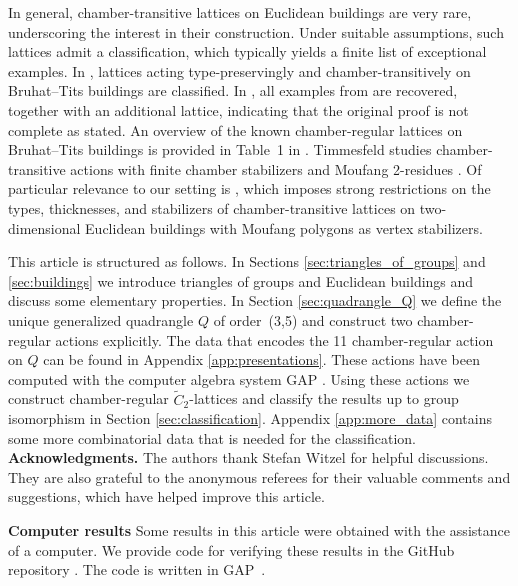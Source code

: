 \documentclass[dvipsnames]{article}
\theoremstyle{definition}
\theoremstyle{remark}
\begin{document}
    In general, chamber-transitive lattices on Euclidean buildings are very rare, underscoring the interest in their construction. Under suitable assumptions, such lattices admit a classification, which typically yields a finite list of exceptional examples.
    In \cite{KantorLieblerTits}, lattices acting type-preservingly and chamber-transitively on Bruhat--Tits buildings are classified. In \cite{KirschmerNebe}, all examples from \cite{KantorLieblerTits} are recovered, together with an additional lattice, indicating that the original proof is not complete as stated. An overview of the known chamber-regular lattices on Bruhat--Tits buildings is provided in Table~1 in \cite{KirschmerNebe}.
    Timmesfeld studies chamber-transitive actions with finite chamber stabilizers and Moufang 2-residues \cite{Timmesfeld_large_thickness, Timmesfeld_Rank3}. Of particular relevance to our setting is \cite[Theorem 1]{Timmesfeld_Rank3}, which imposes strong restrictions on the types, thicknesses, and stabilizers of chamber-transitive lattices on two-dimensional Euclidean buildings with Moufang polygons as vertex stabilizers.

    This article is structured as follows.
    In Sections \ref{sec:triangles_of_groups} and \ref{sec:buildings} we introduce triangles of groups and Euclidean buildings and discuss some elementary properties.
    In Section \ref{sec:quadrangle_Q} we define the unique generalized quadrangle $Q$ of order~(3,5) and construct two chamber-regular actions explicitly.
    The data that encodes the 11 chamber-regular action on $Q$ can be found in Appendix \ref{app:presentations}. These actions have been computed with the computer algebra system GAP \cite{GAP4}.
    Using these actions we construct chamber-regular $\tilde C_2$-lattices and classify the results up to group isomorphism in Section \ref{sec:classification}.    
    Appendix \ref{app:more_data} contains some more combinatorial data that is needed for the classification.\\

    \noindent \textbf{Acknowledgments.} The authors thank Stefan Witzel for helpful discussions. They are also grateful to the anonymous referees for their valuable comments and suggestions, which have helped improve this article.

    \noindent \textbf{Computer results}
    Some results in this article were obtained with the assistance of a computer. We provide code for verifying these results in the GitHub repository \cite{ChamberRegularCode}. The code is written in GAP~\cite{GAP4}.
\end{document}
